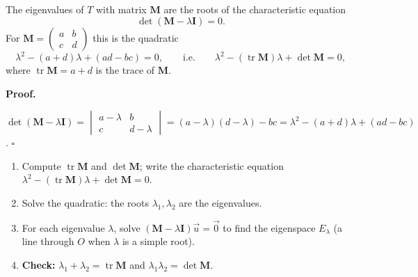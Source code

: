 \documentclass[11pt]{article}
\newcommand{\cle}[1]{{\popxbold\color{popdark}#1}}
\begin{document}
\begin{propriete}
The eigenvalues of $T$ with matrix $\mathbf{M}$ are the roots of the \cle{characteristic equation}
\[
\det(\mathbf{M} - \lambda\mathbf{I}) = 0.
\]
For $\mathbf{M} = \begin{pmatrix} a & b \\ c & d \end{pmatrix}$ this is the quadratic
\[
\lambda^2 - (a+d)\lambda + (ad - bc) = 0,
\qquad\text{i.e.}\qquad
\lambda^2 - (\operatorname{tr}\mathbf{M})\lambda + \det\mathbf{M} = 0,
\]
where $\operatorname{tr}\mathbf{M} = a+d$ is the \cle{trace} of $\mathbf{M}$.
\end{propriete}

\textbf{Proof.}\par
$\det(\mathbf{M}-\lambda\mathbf{I}) = \begin{vmatrix} a-\lambda & b \\ c & d-\lambda \end{vmatrix} = (a-\lambda)(d-\lambda) - bc = \lambda^2 - (a+d)\lambda + (ad-bc)$. \hfill$\square$

\begin{methode}
\begin{enumerate}
    \item Compute $\operatorname{tr}\mathbf{M}$ and $\det\mathbf{M}$; write the characteristic equation $\lambda^2 - (\operatorname{tr}\mathbf{M})\lambda + \det\mathbf{M} = 0$.
    \item Solve the quadratic: the roots $\lambda_1, \lambda_2$ are the eigenvalues.
    \item For each eigenvalue $\lambda$, solve $(\mathbf{M} - \lambda\mathbf{I})\vec{u} = \vec{0}$ to find the eigenspace $E_\lambda$ (a line through $O$ when $\lambda$ is a simple root).
    \item \textbf{Check:} $\lambda_1 + \lambda_2 = \operatorname{tr}\mathbf{M}$ and $\lambda_1\lambda_2 = \det\mathbf{M}$.
\end{enumerate}
\end{methode}
\end{document}
